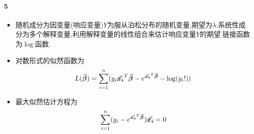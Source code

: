 \documentclass[a4paper]{article}
\begin{document}
\paragraph{5}
\begin{itemize}
    \item 随机成分为因变量(响应变量)$Y$为服从泊松分布的随机变量,期望为$\lambda$.系统性成分为多个解释变量,利用解释变量的线性组合来估计响应变量$Y$的期望.链接函数为$\log$函数.
    \item 对数形式的似然函数为$$L(\va*{\beta})=\sum_{i=1}^n(y_i\va*{x_i}^T\va*{\beta}-e^{\va*{x_i}^T\va*{\beta}}-\log(y_i!))$$
    \item 最大似然估计方程为$$\sum_{i=1}^n(y_i-e^{\va*{x_i}^T\va*{\beta}})\va*{x_i}=0$$
\end{itemize}
\end{document}
